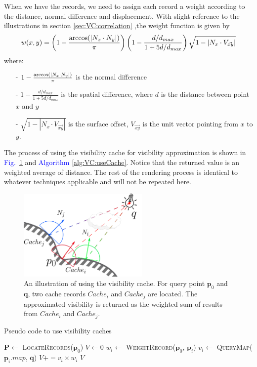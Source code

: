 \documentclass[]{book}
\renewcommand{\figurename}{\textcolor{blue}{Fig.\ }}
\begin{document}
When we have the records, we need to assign each record a weight according to the distance, normal difference and displacement.
With slight reference to the illustrations in section \ref{sec:VC:correlation} ,the weight function is given by
\begin{equation}
	w(x,y) = \left(1-\frac{\textup{arccos}(\left|N_x\cdot N_y\right|)}{\pi}\right)\left( 1-\frac{d/d_{max}}{1+5d/d_{max}} \right ) \sqrt{1-\left|N_x \cdot V_{\vec{xy}} \right|}
\end{equation}
where:
\begin{itemize}
	\item[-] $1-\frac{\textup{arccos}(\left|N_x\cdot N_y\right|)}{\pi}$ is the normal difference
	\item[-] $1-\frac{d/d_{max}}{1+5d/d_{max}}$ is the spatial difference, where $d$ is the distance between point $x$ and $y$
	\item[-] $\sqrt{1-\left|N_x \cdot V_{\vec{xy}} \right|}$ is the surface offset, $V_{\vec{xy}}$ is the unit vector pointing from $x$ to $y$.
\end{itemize}

The process of using the visibility cache for visibility approximation is shown in \figurename \ref{fig:VC:useCache} and \textcolor{blue}{Algorithm} \ref{alg:VC:useCache}.
Notice that the returned value is an weighted average of distance.
The rest of the rendering process is identical to whatever techniques applicable and will not be repeated here.

\begin{figure}[t]
	\centering
	\includegraphics[width=2.5in]{img/VC-3-query.png}
	\caption[Use Visbility Cache]{An illustration of using the visibility cache. For query point $\mathbf{p}_0$ and $\mathbf{q}$, two cache records $Cache_i$ and $Cache_j$ are located. The approximated visibility is returned as the weighted sum of results from $Cache_i$ and $Cache_j$.}
	\label{fig:VC:useCache}
\end{figure}

\begin{algorithm}
	\caption[Use Visibility Caches]{Pseudo code to use visibility caches}
	\label{alg:VC:useCache}
	\begin{algorithmic}[1]
		\State $\mathbf{P} \gets$ \textsc{LocateRecords}($\mathbf{p}_0$)
		\State $V\gets 0$
		\State $w_i \gets$ \textsc{WeightRecord}($\mathbf{p}_0$, $\mathbf{p}_i$)
		\State $v_i\gets$ \textsc{QueryMap}($\mathbf{p}_i.map$, $\mathbf{q}$) 
		\State $V\mathrel{{+}{=}}v_i\times w_i$
		\EndFor
		\State \Return $V$
		\EndProcedure
	\end{algorithmic}
\end{algorithm}
\end{document}
